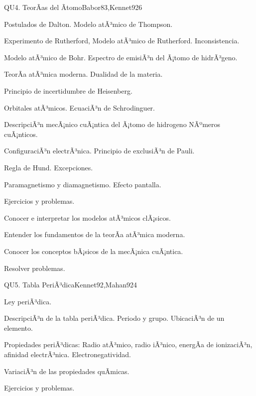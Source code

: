 \begin{syllabus}
\begin{unit}{QU4. TeorÃ­as del Ãtomo}{Babor83,Kennet92}{6}
\begin{topics}
      \item Postulados de Dalton. Modelo atÃ³mico de Thompson.
      \item Experimento de Rutherford, Modelo atÃ³mico de Rutherford. Inconsistencia.
      \item Modelo atÃ³mico de Bohr. Espectro de emisiÃ³n del Ã¡tomo de hidrÃ³geno.
      \item TeorÃ­a atÃ³mica moderna. Dualidad de la materia.
      \item Principio de incertidumbre de Heisenberg.
      \item Orbitales atÃ³micos. EcuaciÃ³n de Schrodinguer.
      \item DescripciÃ³n mecÃ¡nico cuÃ¡ntica del Ã¡tomo de hidrogeno NÃºmeros cuÃ¡nticos.
      \item ConfiguraciÃ³n electrÃ³nica. Principio de exclusiÃ³n de Pauli.
      \item Regla de Hund. Excepciones.
      \item Paramagnetismo y diamagnetismo. Efecto pantalla.
      \item Ejercicios y problemas.
   \end{topics}

   \begin{unitgoals}
      \item Conocer e interpretar los modelos atÃ³micos clÃ¡sicos.
      \item Entender los fundamentos de la teorÃ­a atÃ³mica moderna.
      \item Conocer los conceptos bÃ¡sicos de la mecÃ¡nica cuÃ¡ntica.
      \item Resolver problemas.
   \end{unitgoals}
\end{unit}

\begin{unit}{QU5. Tabla PeriÃ³dica}{Kennet92,Mahan92}{4}
\begin{topics}
	\item Ley periÃ³dica.
	\item DescripciÃ³n de la tabla periÃ³dica. Periodo y grupo. UbicaciÃ³n de un elemento.
	\item Propiedades periÃ³dicas: Radio atÃ³mico, radio iÃ³nico, energÃ­a de ionizaciÃ³n, afinidad electrÃ³nica. Electronegatividad.
	\item VariaciÃ³n de las propiedades quÃ­micas.
	\item Ejercicios y problemas.
   \end{topics}


\end{unit}
\end{syllabus}
